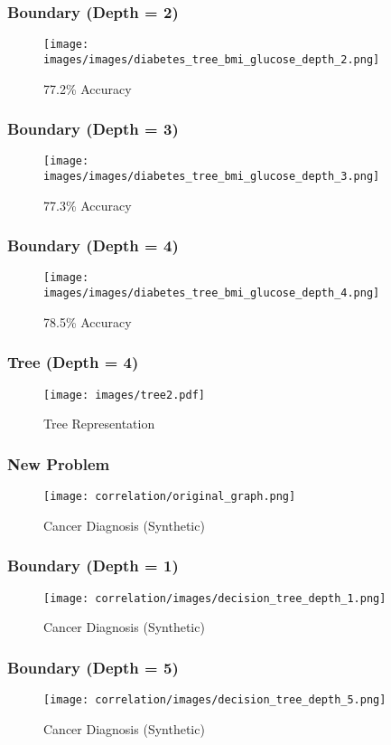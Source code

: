 \documentclass[10pt]{beamer}
\begin{document}
\begin{frame}
	\frametitle{Boundary (Depth = 2)}
	\begin{figure}[h]
		\centering
		\texttt{[image: images/images/diabetes\_tree\_bmi\_glucose\_depth\_2.png]}
		\caption{77.2\% Accuracy}
	\end{figure}
\end{frame}


\begin{frame}
	\frametitle{Boundary (Depth = 3)}
	\begin{figure}[h]
		\centering
		\texttt{[image: images/images/diabetes\_tree\_bmi\_glucose\_depth\_3.png]}
		\caption{77.3\% Accuracy}
	\end{figure}
\end{frame}

\begin{frame}
	\frametitle{Boundary (Depth = 4)}
	\begin{figure}[h]
		\centering
		\texttt{[image: images/images/diabetes\_tree\_bmi\_glucose\_depth\_4.png]}
		\caption{78.5\% Accuracy}
	\end{figure}
\end{frame}

\begin{frame}
	\frametitle{Tree (Depth = 4)}
	\begin{figure}[h]
		\centering
		\texttt{[image: images/tree2.pdf]}
		\caption{Tree Representation}
	\end{figure}
\end{frame}

\begin{frame}
	\frametitle{New Problem}
	\begin{figure}[h]
		\centering
		\texttt{[image: correlation/original\_graph.png]}
		\caption{Cancer Diagnosis (Synthetic)}
	\end{figure}
\end{frame}

\begin{frame}
	\frametitle{Boundary (Depth = 1)}
	\begin{figure}[h]
		\centering
		\texttt{[image: correlation/images/decision\_tree\_depth\_1.png]}
		\caption{Cancer Diagnosis (Synthetic)}
	\end{figure}
\end{frame}

\begin{frame}
	\frametitle{Boundary (Depth = 5)}
	\begin{figure}[h]
		\centering
		\texttt{[image: correlation/images/decision\_tree\_depth\_5.png]}
		\caption{Cancer Diagnosis (Synthetic)}
	\end{figure}
\end{frame}
\end{document}

